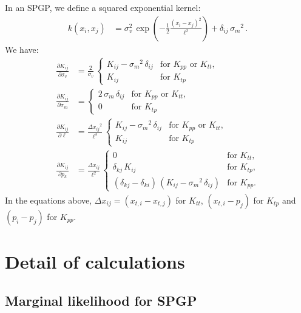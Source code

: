 \documentclass[11pt,a4paper]{article}
\numberwithin{equation}{section}
\begin{document}
In an SPGP, we define a squared exponential kernel:
\begin{align}
k(x_i,x_j) &= \sigma_{v}^2\,\exp\left(-\frac{1}{2}\frac{(x_i - x_j)^2}{\ell^2}\right) + \delta_{ij}\,{\sigma_{m}}^2\,.
\end{align}
We have:
\begin{align}
\frac{\partial K_{ij}}{\partial \sigma_{v}} &= \frac{2}{\sigma_{v}}\,\left\{\begin{array}{ll}
    K_{ij} - {\sigma_{m}}^2\,\delta_{ij} & \text{for $K_{pp}$ or $K_{tt}$,} \\
    K_{ij}& \text{for $K_{tp}$}
\end{array}\right. \\
\frac{\partial K_{ij}}{\partial \sigma_{m}} &= \left\{\begin{array}{ll}
    2\,\sigma_{m}\,\delta_{ij} & \text{for $K_{pp}$ or $K_{tt}$,} \\
    0 & \text{for $K_{tp}$}
\end{array}\right. \\
\frac{\partial K_{ij}}{\partial \ell} &= \frac{{\Delta x_{ij}}^2}{\ell^3}\,\left\{\begin{array}{ll}
    K_{ij} - {\sigma_{m}}^2\,\delta_{ij} & \text{for $K_{pp}$ or $K_{tt}$,} \\
    K_{ij} & \text{for $K_{tp}$}
\end{array}\right. \\
\frac{\partial K_{ij}}{\partial p_k} &= \frac{\Delta x_{ij}}{\ell^2}\,\left\{\begin{array}{ll}
    0 & \text{for $K_{tt}$,} \\
    \delta_{kj}\,K_{ij} & \text{for $K_{tp}$,} \\
    (\delta_{kj} - \delta_{ki})\,\left(K_{ij} - {\sigma_{m}}^2\,\delta_{ij}\right) & \text{for $K_{pp}$.}
\end{array}\right.
\end{align}
In the equations above, $\Delta x_{ij} = (x_{t,i} - x_{t,j})$ for $K_{tt}$, $(x_{t,i} - p_j)$ for $K_{tp}$ and $(p_i - p_j)$ for $K_{pp}$.

\appendix

\section{Detail of calculations}

\subsection{Marginal likelihood for SPGP \label{APP:detail_mlik_spgp}}
\end{document}
